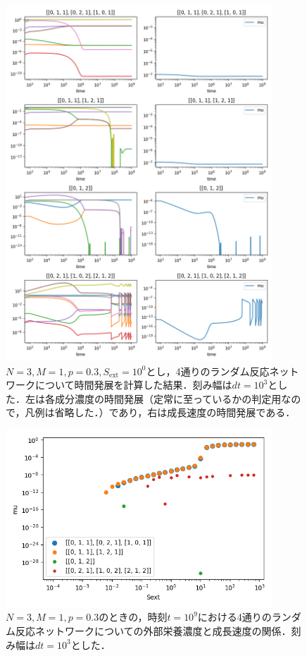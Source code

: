 \documentclass[a4paper,11pt]{jsarticle}
\begin{document}
\begin{figure}[htbp]
  \centering
  \includegraphics[width=10cm]{himeoka_timser_N3_M1_TMAX9_p3_div6_NPLT5_Sext0.png}
  \caption{$N=3,M=1,p=0.3,S_{\mathrm{ext}}=10^{0}$とし，4通りのランダム反応ネットワークについて時間発展を計算した結果．刻み幅は$dt=10^3$とした．左は各成分濃度の時間発展（定常に至っているかの判定用なので，凡例は省略した．）であり，右は成長速度の時間発展である．}
  \label{fig:N3M1S1}
\end{figure}

\begin{figure}[htbp]
  \centering
  \includegraphics[width=10cm]{himeoka_trans_N3_M1_TMAX9_p3_div6.png}
  \caption{$N=3,M=1,p=0.3$のときの，時刻$t=10^9$における4通りのランダム反応ネットワークについての外部栄養濃度と成長速度の関係．刻み幅は$dt=10^3$とした．}
  \label{fig:N3M1}
\end{figure}
\end{document}
